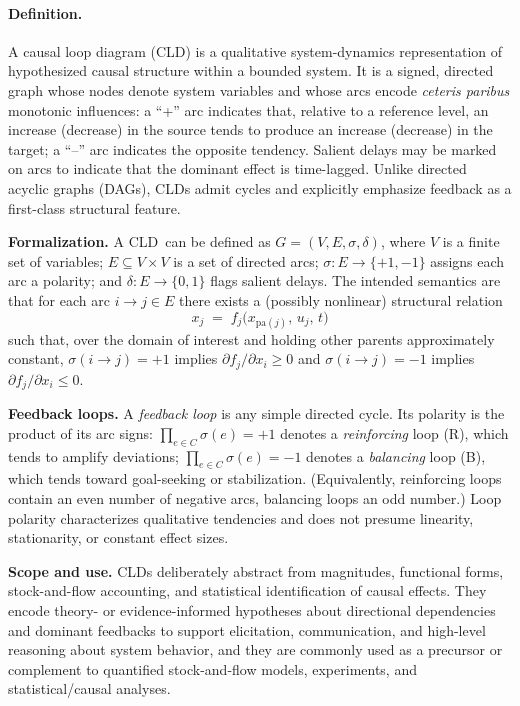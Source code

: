 \newcommand{\CLD}{CLD}
\paragraph{Definition.}
A causal loop diagram (\CLD) is a qualitative system-dynamics representation of hypothesized causal structure within a bounded system. It is a signed, directed graph whose nodes denote system variables and whose arcs encode \emph{ceteris paribus} monotonic influences: a \enquote{+} arc indicates that, relative to a reference level, an increase (decrease) in the source tends to produce an increase (decrease) in the target; a \enquote{--} arc indicates the opposite tendency. Salient delays may be marked on arcs to indicate that the dominant effect is time-lagged. Unlike directed acyclic graphs (DAGs), CLDs admit cycles and explicitly emphasize feedback as a first-class structural feature.

\medskip
\noindent
\textbf{Formalization.} A \CLD\ can be defined as \(G=(V,E,\sigma,\delta)\), where \(V\) is a finite set of variables; \(E\subseteq V\times V\) is a set of directed arcs; \(\sigma:E\rightarrow\{+1,-1\}\) assigns each arc a polarity; and \(\delta:E\rightarrow\{0,1\}\) flags salient delays. The intended semantics are that for each arc \(i\rightarrow j\in E\) there exists a (possibly nonlinear) structural relation
\[
x_j \;=\; f_j\!\bigl(x_{\mathrm{pa}(j)},\,u_j,\,t\bigr)
\]
such that, over the domain of interest and holding other parents approximately constant, \(\sigma(i\rightarrow j)=+1\) implies \(\partial f_j/\partial x_i \ge 0\) and \(\sigma(i\rightarrow j)=-1\) implies \(\partial f_j/\partial x_i \le 0\).

\medskip
\noindent
\textbf{Feedback loops.} A \emph{feedback loop} is any simple directed cycle. Its polarity is the product of its arc signs: \(\prod_{e\in C}\sigma(e)=+1\) denotes a \emph{reinforcing} loop (R), which tends to amplify deviations; \(\prod_{e\in C}\sigma(e)=-1\) denotes a \emph{balancing} loop (B), which tends toward goal-seeking or stabilization. (Equivalently, reinforcing loops contain an even number of negative arcs, balancing loops an odd number.) Loop polarity characterizes qualitative tendencies and does not presume linearity, stationarity, or constant effect sizes.

\medskip
\noindent
\textbf{Scope and use.} \CLD s deliberately abstract from magnitudes, functional forms, stock-and-flow accounting, and statistical identification of causal effects. They encode theory- or evidence-informed hypotheses about directional dependencies and dominant feedbacks to support elicitation, communication, and high-level reasoning about system behavior, and they are commonly used as a precursor or complement to quantified stock-and-flow models, experiments, and statistical/causal analyses.

